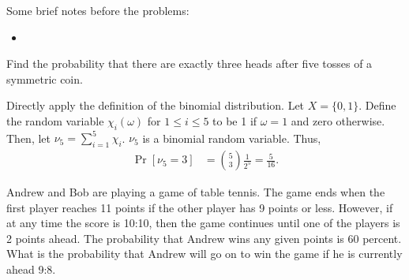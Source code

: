 Some brief notes before the problems:
\begin{itemize}
    \item \color{brickred}{Koralov and Sinai use $\times$ instead of $\otimes$ for the product $\sigma$-algebra. Moving forward, the reader needs to be cautious about what the operands are. For if they are $\sigma$-algebras, we understand the result of the expression to be the aforementioned product.} 
\end{itemize}
\begin{problem}{1}
    Find the probability that there are exactly three heads after five tosses of a symmetric coin.
\end{problem}
\begin{solution}
    Directly apply the definition of the binomial distribution. Let $X = \{0,1\}$. Define the random variable $\chi_i(\omega)$ for $1\leq i\leq 5$ to be 1 if $\omega = 1$ and zero otherwise. Then, let $\nu_5 = \sum_{i=1}^5 \chi_i$. $\nu_5$ is a binomial random variable. Thus,
    \begin{align*}
        \Pr[\nu_5 = 3] &= \binom{5}{3} \frac{1}{2^5} = \frac{5}{16}.
    \end{align*}
\end{solution}
\begin{problem}{2}
    Andrew and Bob are playing a game of table tennis. The game ends when the first player reaches 11 points if the other player has 9 points or less. However, if at any time the score is 10:10, then the game continues until one of the players is 2 points ahead. The probability that Andrew wins any given points is 60 percent. What is the probability that Andrew will go on to win the game if he is currently ahead 9:8.
\end{problem}
